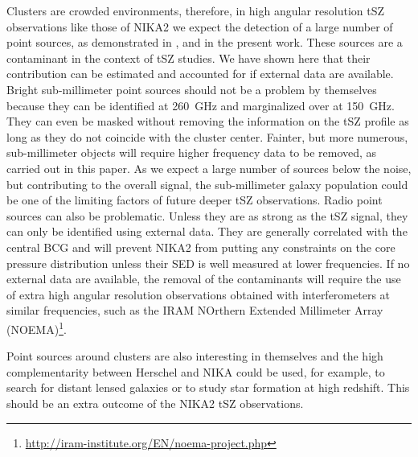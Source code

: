 \documentclass[traditabstract]{aa}
\begin{document}
Clusters are crowded environments, therefore, in high angular resolution tSZ observations like those of NIKA2 we expect the detection of a large number of point sources, as demonstrated in \cite{adam2013}, \cite{adam2014} and in the present work. These sources are a contaminant in the context of tSZ studies. We have shown here that their contribution can be estimated and accounted for if external data are available. Bright sub-millimeter point sources should not be a problem by themselves because they can be identified at 260~GHz and marginalized over at 150~GHz. They can even be masked without removing the information on the tSZ profile as long as they do not coincide with the cluster center. Fainter, but more numerous, sub-millimeter objects will require higher frequency data to be removed, as carried out in this paper. As we expect a large number of sources below the noise, but contributing to the overall signal, the sub-millimeter galaxy population could be one of the limiting factors of future deeper tSZ observations. Radio point sources can also be problematic. Unless they are as strong as the tSZ signal, they can only be identified using external data. They are generally correlated with the central BCG and will prevent NIKA2 from putting any constraints on the core pressure distribution unless their SED is well measured at lower frequencies. If no external data are available, the removal of the contaminants will require the use of extra high angular resolution observations obtained with interferometers at similar frequencies, such as the IRAM NOrthern Extended Millimeter Array (NOEMA)\footnote{\url{http://iram-institute.org/EN/noema-project.php}}. 

Point sources around clusters are also interesting in themselves and the high complementarity between Herschel and NIKA could be used, for example, to search for distant lensed galaxies \citep[see, for example,][]{egami2010} or to study star formation at high redshift. This should be an extra outcome of the NIKA2 tSZ observations.
\end{document}
